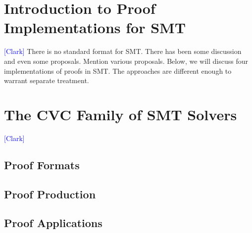 \documentclass{llncs}
\newcommand{\Note}[1]{\textcolor{blue}{[#1]}}
\begin{document}






\section{Introduction to Proof Implementations for SMT}

\Note{Clark}
There is no standard format for SMT.  There has been some discussion and even
some proposals.  Mention various proposals.  Below, we will discuss four
implementations of proofs in SMT.  The approaches are different enough to
warrant separate treatment.

\section{The CVC Family of SMT Solvers}
\Note{Clark}
\subsection{Proof Formats}
\subsection{Proof Production}
\subsection{Proof Applications}
\end{document}
